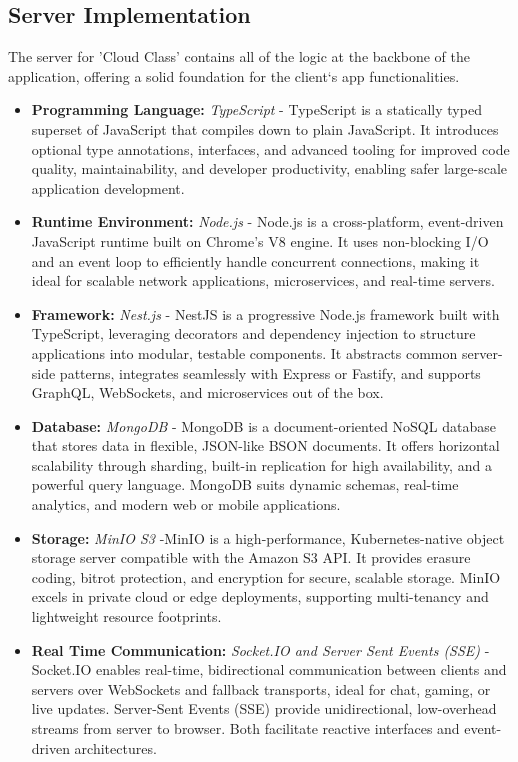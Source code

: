 \subsection{Server Implementation}
The server for 'Cloud Class' contains all of the logic at the backbone of the application, offering a solid foundation for the client`s app functionalities.

\begin{itemize}
    \item \textbf{Programming Language:} \textit{TypeScript} - TypeScript is a statically typed superset of JavaScript that compiles down to plain JavaScript. It introduces optional type annotations, interfaces, and advanced tooling for improved code quality, maintainability, and developer productivity, enabling safer large-scale application development.
    \item \textbf{Runtime Environment:} \textit{Node.js} - Node.js is a cross-platform, event-driven JavaScript runtime built on Chrome’s V8 engine. It uses non-blocking I/O and an event loop to efficiently handle concurrent connections, making it ideal for scalable network applications, microservices, and real-time servers.
    \item \textbf{Framework:} \textit{Nest.js} - NestJS is a progressive Node.js framework built with TypeScript, leveraging decorators and dependency injection to structure applications into modular, testable components. It abstracts common server-side patterns, integrates seamlessly with Express or Fastify, and supports GraphQL, WebSockets, and microservices out of the box.
    \item \textbf{Database:} \textit{MongoDB} - MongoDB is a document-oriented NoSQL database that stores data in flexible, JSON-like BSON documents. It offers horizontal scalability through sharding, built-in replication for high availability, and a powerful query language. MongoDB suits dynamic schemas, real-time analytics, and modern web or mobile applications.
    \item \textbf{Storage:} \textit{MinIO S3} -MinIO is a high-performance, Kubernetes-native object storage server compatible with the Amazon S3 API. It provides erasure coding, bitrot protection, and encryption for secure, scalable storage. MinIO excels in private cloud or edge deployments, supporting multi-tenancy and lightweight resource footprints.
    \item \textbf{Real Time Communication:} \textit{Socket.IO and Server Sent Events (SSE)} - Socket.IO enables real-time, bidirectional communication between clients and servers over WebSockets and fallback transports, ideal for chat, gaming, or live updates. Server-Sent Events (SSE) provide unidirectional, low-overhead streams from server to browser. Both facilitate reactive interfaces and event-driven architectures.

\end{itemize}
